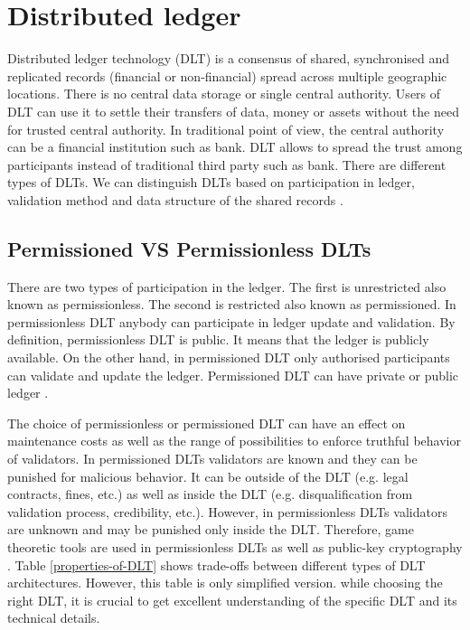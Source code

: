 \section{Distributed ledger}
\quad Distributed ledger technology (DLT) is a consensus of shared, synchronised and replicated records (financial or non-financial) spread across multiple geographic locations. There is no central data storage or single central authority. Users of DLT can use it to settle their transfers of data, money or assets without the need for trusted central authority. In traditional point of view, the central authority can be a financial institution such as bank. DLT allows to spread the trust among participants instead of traditional third party such as bank. There are different types of DLTs. We can distinguish DLTs based on participation in ledger, validation method and data structure of the shared records \cite{pinna_distributed_2016}.

\subsection{Permissioned VS Permissionless DLTs}
There are two types of participation in the ledger. The first is unrestricted also known as permissionless. The second is restricted also known as permissioned\cite{mattila_blockchain_2016}. In permissionless DLT anybody can participate in ledger update and validation. By definition, permissionless DLT is public. It means that the ledger is publicly available. On the other hand, in permissioned DLT only authorised participants can validate and update the ledger. Permissioned DLT can have private or public ledger \cite{pinna_distributed_2016}.

The choice of permissionless or permissioned DLT can have an effect on maintenance costs as well as the range of possibilities to enforce truthful behavior of validators. In permissioned DLTs validators are known and they can be punished for malicious behavior. It can be outside of the DLT (e.g. legal contracts, fines, etc.) as well as inside the DLT (e.g. disqualification from validation process, credibility, etc.). However, in permissionless DLTs validators are unknown and may be punished only inside the DLT. Therefore, game theoretic tools are used in permissionless DLTs as well as public-key cryptography \cite{mattila_blockchain_2016}. Table \ref{properties-of-DLT} shows trade-offs between different types of DLT architectures. However, this table is only simplified version. while choosing the right DLT, it is crucial to get excellent understanding of the specific DLT and its technical details.

